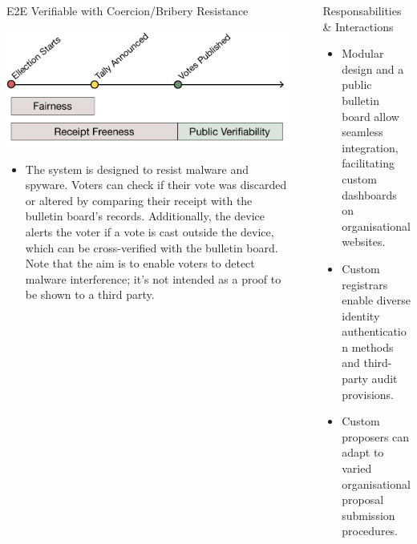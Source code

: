 \documentclass[final]{beamer}
\newlength{\sepwidth}
\newlength{\colwidth}
\newcommand{\separatorcolumn}{\begin{column}{\sepwidth}\end{column}}
\begin{document}
\begin{frame}[t]
\begin{columns}[t]
\begin{column}{\colwidth}
\begin{block}{E2E Verifiable with Coercion/Bribery Resistance}
    \begin{center}
      \vspace{-0.5cm}
      \includegraphics[width=0.5\colwidth]{figures/receipt-freeness.pdf}
      \vspace{-1cm}
    \end{center}
    
    \begin{itemize}
    \item The system is designed to resist malware and spyware. Voters can check if their vote was discarded or altered by comparing their receipt with the bulletin board’s records. Additionally, the device alerts the voter if a vote is cast outside the device, which can be cross-verified with the bulletin board. Note that the aim is to enable voters to detect malware interference; it’s not intended as a proof to be shown to a third party.
    \end{itemize}
    
  \end{block}

  
\end{column}

\separatorcolumn

\begin{column}{\colwidth}

\vspace{-5cm}
  
  \begin{block}{Responsabilities \& Interactions}

    \begin{itemize}
    \item Modular design and a public bulletin board allow seamless integration, facilitating custom dashboards on organisational websites.
    \item Custom registrars enable diverse identity authentication methods and third-party audit provisions. 
    \item Custom proposers can adapt to varied organisational proposal submission procedures. 
    \end{itemize}


\end{block}
\end{column}
\end{columns}
\end{frame}
\end{document}
